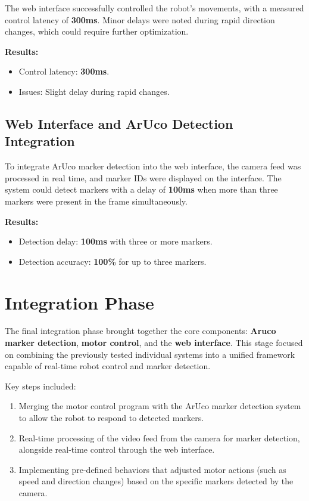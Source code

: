 The web interface successfully controlled the robot's movements, with a measured control latency of \textbf{300ms}. Minor delays were noted during rapid direction changes, which could require further optimization.

\textbf{Results:}
\begin{itemize}
	\item Control latency: \textbf{300ms}.
	\item Issues: Slight delay during rapid changes.
\end{itemize}

\subsection{Web Interface and ArUco Detection Integration}

To integrate ArUco marker detection into the web interface, the camera feed was processed in real time, and marker IDs were displayed on the interface. The system could detect markers with a delay of \textbf{100ms} when more than three markers were present in the frame simultaneously.

\textbf{Results:}
\begin{itemize}
	\item Detection delay: \textbf{100ms} with three or more markers.
	\item Detection accuracy: \textbf{100\%} for up to three markers.
\end{itemize}

\section{Integration Phase}

The final integration phase brought together the core components: \textbf{Aruco marker detection}, \textbf{motor control}, and the \textbf{web interface}. This stage focused on combining the previously tested individual systems into a unified framework capable of real-time robot control and marker detection.

Key steps included:
\begin{enumerate}
	\item Merging the motor control program with the ArUco marker detection system to allow the robot to respond to detected markers.
	\item Real-time processing of the video feed from the camera for marker detection, alongside real-time control through the web interface.
	\item Implementing pre-defined behaviors that adjusted motor actions (such as speed and direction changes) based on the specific markers detected by the camera.
\end{enumerate}


